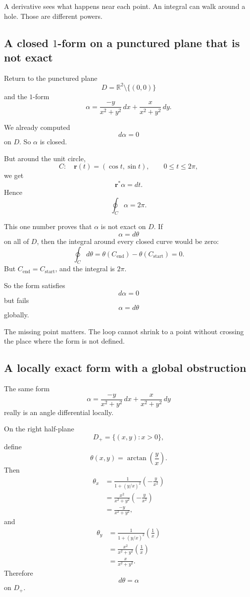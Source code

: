 A derivative sees what happens near each point.  An integral can walk around a hole.
Those are different powers.

\subsection{A closed \texorpdfstring{\(1\)}{1}-form on a punctured plane that is not exact}

Return to the punctured plane
\[
    D=\mathbb R^2\setminus\{(0,0)\}
\]
and the \(1\)-form
\[
\boxed{
    \alpha=
    \frac{-y}{x^2+y^2}\,dx+
    \frac{x}{x^2+y^2}\,dy.
}
\]

We already computed
\[
    d\alpha=0
\]
on \(D\).  So \(\alpha\) is closed.

But around the unit circle,
\[
    C:\quad \mathbf r(t)=(\cos t,\sin t),
    \qquad 0\le t\le2\pi,
\]
we get
\[
    \mathbf r^*\alpha=dt.
\]
Hence
\[
\boxed{
    \oint_C\alpha=2\pi.
}
\]

This one number proves that \(\alpha\) is not exact on \(D\).  If
\[
    \alpha=d\theta
\]
on all of \(D\), then the integral around every closed curve would be zero:
\[
    \oint_C d\theta=\theta(C_{\text{end}})-\theta(C_{\text{start}})=0.
\]
But \(C_{\text{end}}=C_{\text{start}}\), and the integral is \(2\pi\).

So the form satisfies
\[
    d\alpha=0
\]
but fails
\[
    \alpha=d\theta
\]
globally.

The missing point matters.  The loop cannot shrink to a point without crossing the
place where the form is not defined.

\subsection{A locally exact form with a global obstruction}

The same form
\[
    \alpha=
    \frac{-y}{x^2+y^2}\,dx+
    \frac{x}{x^2+y^2}\,dy
\]
really is an angle differential locally.

On the right half-plane
\[
    D_+=\{(x,y):x>0\},
\]
define
\[
    \theta(x,y)=\arctan\left(\frac{y}{x}\right).
\]
Then
\[
\begin{aligned}
\theta_x
&=
\frac{1}{1+(y/x)^2}\left(-\frac{y}{x^2}\right)\\
&=
\frac{x^2}{x^2+y^2}\left(-\frac{y}{x^2}\right)\\
&=
\frac{-y}{x^2+y^2},
\end{aligned}
\]
and
\[
\begin{aligned}
\theta_y
&=
\frac{1}{1+(y/x)^2}\left(\frac1x\right)\\
&=
\frac{x^2}{x^2+y^2}\left(\frac1x\right)\\
&=
\frac{x}{x^2+y^2}.
\end{aligned}
\]
Therefore
\[
\boxed{
    d\theta=\alpha
}
\]
on \(D_+\).

